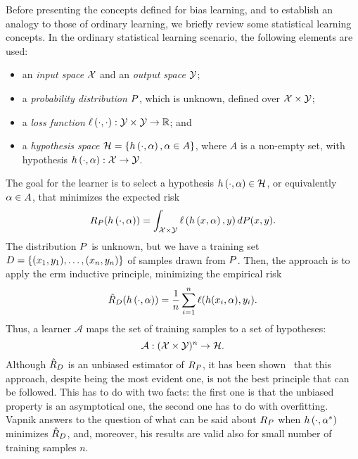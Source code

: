 Before presenting the concepts defined for bias learning, and to establish an analogy to those of ordinary learning, we briefly review some statistical learning concepts.
In the ordinary statistical learning scenario, the following elements are used:
\begin{itemize}
    \item an \emph{input space} $\mathcal{X}$ and an \emph{output space} $\mathcal{Y}$;
    \item a \emph{probability distribution} $P$, which is unknown, defined over $\mathcal{X} \times \mathcal{Y}$;
    \item a \emph{loss function} $\ell\left( \cdot, \cdot\right):\mathcal{Y} \times \mathcal{Y} \to \mathbb{R}$; and
    \item a \emph{hypothesis space} $\mathcal{H} = \left\{h\left(\cdot, \alpha\right), \alpha \in A\right\}$, where $A$ is a non-empty set, with hypothesis $h\left(\cdot, \alpha\right): \mathcal{X} \to \mathcal{Y}$.
\end{itemize}
The goal for the learner is to select a hypothesis $h\left(\cdot, \alpha\right) \in \mathcal{H}$, or equivalently $\alpha \in A$, that minimizes the expected risk
$$ R_P(h\left(\cdot, \alpha\right)) =  \int_{\mathcal{X} \times \mathcal{Y}} \ell\left( h\left(x, \alpha\right), y\right) dP(x, y) .$$
The distribution $P$ is unknown, but we have a training set $D = \{(x_1, y_1), \ldots, (x_n, y_n)\}$ of samples drawn from $P$. 
Then, the approach is to apply the \acrshort{erm} inductive principle, minimizing the empirical risk
$$ \hat{R}_{D}(h\left(\cdot, \alpha\right)) = \frac{1}{n} \sum_{i=1}^n \ell(h(x_i, \alpha), y_i).$$
Thus, a learner $\mathcal{A}$ maps the set of training samples to a set of hypotheses:
\begin{equation}
    \nonumber
    \mathcal{A} : {(\mathcal{X} \times \mathcal{Y})^n} \to \mathcal{H}.
\end{equation}
Although $\hat{R}_{D}$ is an unbiased estimator of $R_P$, it has been shown~\citep{Vapnik00} that this approach, despite being the most evident one, is not the best principle that can be followed.
This has to do with two facts: the first one is that the unbiased property is an asymptotical one, the second one has to do with overfitting.
Vapnik answers to the question of what can be said about $R_P$ when $h\left(\cdot, \alpha^*\right)$ minimizes $\hat{R}_{D}$, and, moreover, his results are valid also for small number of training samples $n$.
